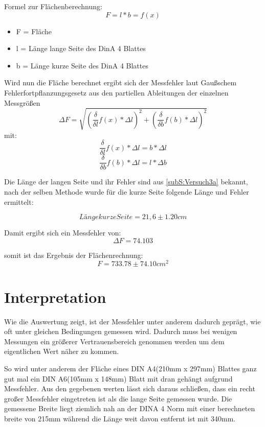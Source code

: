 Formel zur Flächenberechnung:
\begin{equation}
	F = l * b = f(x)
\end{equation}
\begin{itemize}
	\item F = Fläche
	\item l = Länge lange Seite des DinA 4 Blattes
	\item b = Länge kurze Seite des DinA 4 Blattes
\end{itemize}
Wird nun die Fläche berechnet ergibt sich der Messfehler laut Gaußschem Fehlerfortpflanzungsgesetz aus den partiellen Ableitungen der einzelnen Messgrößen
\begin{equation}
	\Delta F = \sqrt{(\frac{\delta}{\delta l}f(x) * \Delta l)^2 + (\frac{\delta}{\delta b}f(b) * \Delta l)^2}
\end{equation}
mit:
\begin{equation}
	\frac{\delta}{\delta l}f(x) * \Delta l = b * \Delta l
\end{equation}
\begin{equation}
	\frac{\delta}{\delta b}f(b) * \Delta l = l * \Delta b
\end{equation}

Die Länge der langen Seite und ihr Fehler sind aus \ref{subS:Versuch3a} bekannt, nach der selben Methode wurde für die kurze Seite folgende Länge und Fehler ermittelt:

\begin{equation}
	Länge kurze Seite = 21,6 \pm 1.20 cm
\end{equation}

Damit ergibt sich ein Messfehler von:
\begin{equation}
	\Delta F = 74.103
\end{equation}

somit ist das Ergebnis der Flächenrechnung:
\begin{equation}
	F = 733.78 \pm 74.10 cm^2
\end{equation}


\section{Interpretation}
\label{chap:VERSUCH_3_INTERPRETATION}

Wie die Auswertung zeigt, ist der Messfehler unter anderem dadurch geprägt, wie oft unter gleichen Bedingungen gemessen wird. Dadurch muss bei wenigen Messungen ein größerer Vertrauensbereich genommen werden um dem eigentlichen Wert näher zu kommen.

So wird unter anderem der Fläche eines DIN A4(210mm x 297mm) Blattes ganz gut mal ein DIN A6(105mm x 148mm) Blatt mit dran gehängt aufgrund Messfehler.
Aus den gegebenen werten lässt sich daraus schließen, dass ein recht großer Messfehler eingetreten ist als die lange Seite gemessen wurde. Die gemessene Breite liegt ziemlich nah an der DINA 4 Norm mit einer berechneten breite von 215mm während die Länge weit davon entfernt ist mit 340mm.
